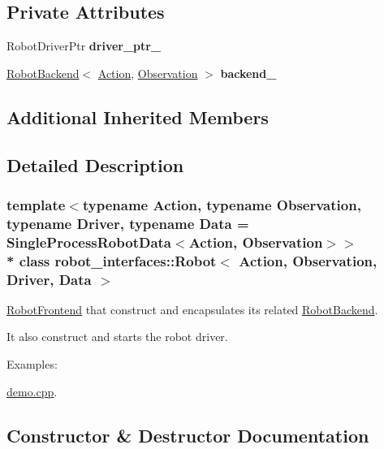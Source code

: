 \subsection*{Private Attributes}
\begin{DoxyCompactItemize}
\item 
Robot\+Driver\+Ptr {\bfseries driver\+\_\+ptr\+\_\+}\hypertarget{classrobot__interfaces_1_1Robot_add04574720fb6d4ecc9fd74678b3627e}{}\label{classrobot__interfaces_1_1Robot_add04574720fb6d4ecc9fd74678b3627e}

\item 
\hyperlink{classrobot__interfaces_1_1RobotBackend}{Robot\+Backend}$<$ \hyperlink{classAction}{Action}, \hyperlink{classObservation}{Observation} $>$ {\bfseries backend\+\_\+}\hypertarget{classrobot__interfaces_1_1Robot_abefd57cd42aad6c21b3db990d4488db4}{}\label{classrobot__interfaces_1_1Robot_abefd57cd42aad6c21b3db990d4488db4}

\end{DoxyCompactItemize}
\subsection*{Additional Inherited Members}


\subsection{Detailed Description}
\subsubsection*{template$<$typename Action, typename Observation, typename Driver, typename Data = Single\+Process\+Robot\+Data$<$\+Action, Observation$>$$>$\\*
class robot\+\_\+interfaces\+::\+Robot$<$ Action, Observation, Driver, Data $>$}

\hyperlink{classrobot__interfaces_1_1RobotFrontend}{Robot\+Frontend} that construct and encapsulates its related \hyperlink{classrobot__interfaces_1_1RobotBackend}{Robot\+Backend}. 

It also construct and starts the robot driver. \begin{Desc}
\item[Examples\+: ]\par
\hyperlink{demo_8cpp-example}{demo.\+cpp}.\end{Desc}


\subsection{Constructor \& Destructor Documentation}
